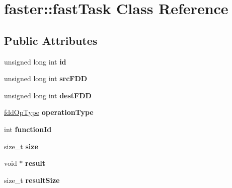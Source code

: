 \hypertarget{classfaster_1_1fastTask}{}\section{faster\+:\+:fast\+Task Class Reference}
\label{classfaster_1_1fastTask}
\subsection*{Public Attributes}
\begin{DoxyCompactItemize}
\item 
\hypertarget{classfaster_1_1fastTask_a0893bafe3573403565cd646887a75f0c}{}\label{classfaster_1_1fastTask_a0893bafe3573403565cd646887a75f0c} 
unsigned long int {\bfseries id}
\item 
\hypertarget{classfaster_1_1fastTask_a667e6dcb5f2088feaaec6be6c1dd7c64}{}\label{classfaster_1_1fastTask_a667e6dcb5f2088feaaec6be6c1dd7c64} 
unsigned long int {\bfseries src\+F\+DD}
\item 
\hypertarget{classfaster_1_1fastTask_ac4f233cc30ee2cc62cdffd6cb07fdb62}{}\label{classfaster_1_1fastTask_ac4f233cc30ee2cc62cdffd6cb07fdb62} 
unsigned long int {\bfseries dest\+F\+DD}
\item 
\hypertarget{classfaster_1_1fastTask_a8a1ca149031975f2200067efdf13c18f}{}\label{classfaster_1_1fastTask_a8a1ca149031975f2200067efdf13c18f} 
\hyperlink{namespacefaster_a64379512d12d41c6e58f176939abfd80}{fdd\+Op\+Type} {\bfseries operation\+Type}
\item 
\hypertarget{classfaster_1_1fastTask_a2803df27d5825ff2420ff53f833f0e0d}{}\label{classfaster_1_1fastTask_a2803df27d5825ff2420ff53f833f0e0d} 
int {\bfseries function\+Id}
\item 
\hypertarget{classfaster_1_1fastTask_abb6680128fc1658c092d3ca57cf1fedc}{}\label{classfaster_1_1fastTask_abb6680128fc1658c092d3ca57cf1fedc} 
size\+\_\+t {\bfseries size}
\item 
\hypertarget{classfaster_1_1fastTask_a4bfc59e6752f4a26c990a701c36bae5d}{}\label{classfaster_1_1fastTask_a4bfc59e6752f4a26c990a701c36bae5d} 
void $\ast$ {\bfseries result}
\item 
\hypertarget{classfaster_1_1fastTask_a01e745141b563ad20722a431390b5df6}{}\label{classfaster_1_1fastTask_a01e745141b563ad20722a431390b5df6} 
size\+\_\+t {\bfseries result\+Size}
\item 
\hypertarget{classfaster_1_1fastTask_a5065a797b2f5f031bde3979d664c8fd3}{}\label{classfaster_1_1fastTask_a5065a797b2f5f031bde3979d664c8fd3} 

\end{DoxyCompactItemize}
